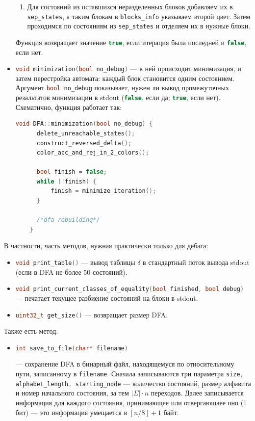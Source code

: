 \documentclass{article}
\begin{document}
\begin{itemize}
\begin{enumerate}
    \item Для состояний из оставшихся неразделенных блоков добавляем их в \lstinline[language=C++]!sep_states!, а таким блокам в \lstinline[language=C++]!blocks_info! указываем второй цвет. Затем проходимся по состояниям из \lstinline[language=C++]!sep_states! и отделяем их в нужные блоки.

  \end{enumerate}
  Функция возвращает значение \lstinline[language=C++]!true!, если итерация была последней и \lstinline[language=C++]!false!, если нет.
  \item[\ding{228}] \lstinline[language=C++]!void minimization(bool no_debug)! --- в ней происходит минимизация, и затем перестройка автомата: каждый блок становится одним состоянием. Аргумент \lstinline[language=C++]!bool no_debug! показывает, нужен ли вывод промежуточных резальтатов минимизации в stdout (\lstinline[language=C++]!false!, если да; \lstinline[language=C++]!true!, если нет). Схематично, функция работает так:
  \begin{lstlisting}[language=C++]
    void DFA::minimization(bool no_debug) {
      delete_unreachable_states();
      construct_reversed_delta();
      color_acc_and_rej_in_2_colors();

      bool finish = false;
      while (!finish) {
          finish = minimize_iteration();
      }

      /*dfa rebuilding*/
    }
  \end{lstlisting}
\end{itemize}
В частности, часть методов, нужная практически только для дебага:
\begin{itemize}
\item[\ding{228}] \lstinline[language=C++]!void print_table()! --- вывод таблицы $\delta$ в стандартный поток вывода stdout (если в DFA не более 50 состояний).
\item[\ding{228}] \lstinline[language=C++]!void print_current_classes_of_equality(bool finished, bool debug)! --- печатает текущее разбиение состояний на блоки в stdout.
\item[\ding{228}] \lstinline[language=C++]!uint32_t get_size()! --- возвращает размер DFA.
\end{itemize}
Также есть метод:
\begin{itemize}
  \item[\ding{228}] \hypertarget{p2}{\lstinline[language=C++]!int save_to_file(char* filename)!} --- сохранение DFA в бинарный файл, находящемуся по относительному пути, записанному в \lstinline[language=C++]!filename!. Сначала записываются три параметра \lstinline[language=C++]!size, alphabet_length, starting_node! --- количество состояний, размер алфавита и номер начального состояния, за тем $|\Sigma| \cdot n$ переходов. Далее записывается информация для каждого состояния, принимающее или отвергающаее оно (1 бит) --- это информация умещается в $[n/8] + 1$ байт. 
\end{itemize}
\end{document}
